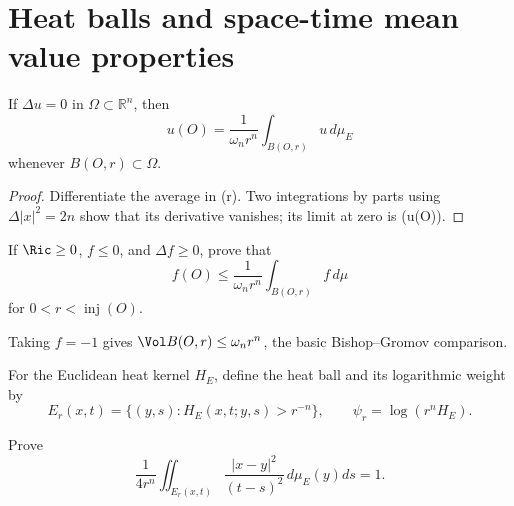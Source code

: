 \section{Heat balls and space-time mean value properties}

\begin{theorem}
\label{thm:chow-iii-euclidean-harmonic-mean-value-property}
If \(\Delta u=0\) in \(\Omega\subset\mathbb R^n\), then
\[
 u(O)=\frac1{\omega_nr^n}\int_{B(O,r)}u\,d\mu_E
\]
whenever \(B(O,r)\subset\Omega\).
\end{theorem}
\begin{proof}
\sketch Differentiate the average in (r).  Two integrations by parts using
\(\Delta|x|^2=2n\) show that its derivative vanishes; its limit at zero is
(u(O)).
\end{proof}

\begin{claim}
\label{clm:chow-iii-nonpositive-subharmonic-mean-value-exercise}
If \(\Ric\ge0\), \(f\le0\), and \(\Delta f\ge0\), prove that
\[
 f(O)\le\frac1{\omega_nr^n}\int_{B(O,r)}f\,d\mu
\]
for \(0<r<\operatorname{inj}(O)\).
\end{claim}

\begin{remark}
\label{rem:chow-iii-nonnegative-ricci-euclidean-volume-bound}
Taking \(f=-1\) gives \(\Vol B(O,r)\le\omega_nr^n\), the basic
Bishop--Gromov comparison.
\end{remark}

For the Euclidean heat kernel \(H_E\), define the heat ball and its logarithmic
weight by
\[
 E_r(x,t)=\{(y,s):H_E(x,t;y,s)>r^{-n}\},
 \qquad \psi_r=\log(r^nH_E).
\]

\begin{claim}
\label{clm:chow-iii-euclidean-heat-ball-normalization-exercise}
Prove
\[
 \frac1{4r^n}\iint_{E_r(x,t)}\frac{|x-y|^2}{(t-s)^2}
 \,d\mu_E(y)ds=1.
\]
\end{claim}

